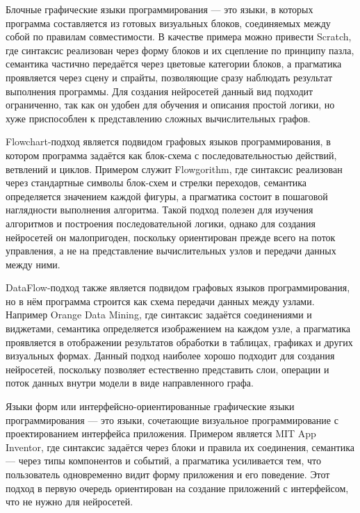 \documentclass{report}
\begin{document}
\begin{enumarabic}
\item Блочные графические языки программирования — это языки, в которых программа составляется из готовых визуальных блоков, соединяемых между собой по правилам совместимости. В качестве примера можно привести Scratch, где синтаксис реализован через форму блоков и их сцепление по принципу пазла, семантика частично передаётся через цветовые категории блоков, а прагматика проявляется через сцену и спрайты, позволяющие сразу наблюдать результат выполнения программы. Для создания нейросетей данный вид подходит ограниченно, так как он удобен для обучения и описания простой логики, но хуже приспособлен к представлению сложных вычислительных графов.
\item Flowchart-подход является подвидом графовых языков программирования, в котором программа задаётся как блок-схема с последовательностью действий, ветвлений и циклов. Примером служит Flowgorithm, где синтаксис реализован через стандартные символы блок-схем и стрелки переходов, семантика определяется значением каждой фигуры, а прагматика состоит в пошаговой наглядности выполнения алгоритма. Такой подход полезен для изучения алгоритмов и построения последовательной логики, однако для создания нейросетей он малопригоден, поскольку ориентирован прежде всего на поток управления, а не на представление вычислительных узлов и передачи данных между ними.
\item DataFlow-подход также является подвидом графовых языков программирования, но в нём программа строится как схема передачи данных между узлами. Например Orange Data Mining, где синтаксис задаётся соединениями и виджетами, семантика определяется изображением на каждом узле, а прагматика проявляется в отображении результатов обработки в таблицах, графиках и других визуальных формах. Данный подход наиболее хорошо подходит для создания нейросетей, поскольку позволяет естественно представить слои, операции и поток данных внутри модели в виде направленного графа.
\item Языки форм или интерфейсно-ориентированные графические языки программирования — это языки, сочетающие визуальное программирование с проектированием интерфейса приложения. Примером является MIT App Inventor, где синтаксис задаётся через блоки и правила их соединения, семантика — через типы компонентов и событий, а прагматика усиливается тем, что пользователь одновременно видит форму приложения и его поведение. Этот подход в первую очередь ориентирован на создание приложений с интерфейсом, что не нужно для нейросетей.
\end{enumarabic}
\end{document}
